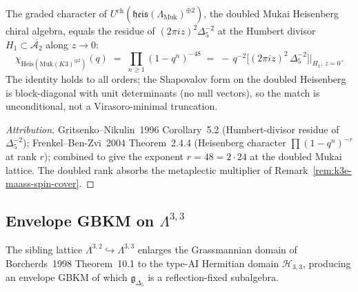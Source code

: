 \begin{theorem}
\label{thm:plat-heis-mukai-48}
The graded character of $U^{\mathrm{ch}}(\mathfrak{heis}(\Lambda_{\mathrm{Muk}})^{\oplus 2})$, the doubled Mukai Heisenberg chiral algebra, equals the residue of $(2\pi i z)^2 \Delta_5^{-2}$ at the Humbert divisor $H_1 \subset \overline{\mathcal{A}_2}$ along $z \to 0$:
\[
 \chi_{\mathrm{Heis}(\mathrm{Muk}(K3)^{\oplus 2})}(q) \;=\; \prod_{n \geq 1}(1 - q^n)^{-48} \;=\; -\,q^{-2}\bigl[(2\pi i z)^2\, \Delta_5^{-2}\bigr]\Big|_{H_1,\, z = 0}.
\]
The identity holds to all orders; the Shapovalov form on the doubled Heisenberg is block-diagonal with unit determinants (no null vectors), so the match is unconditional, not a Virasoro-minimal truncation.
\end{theorem}

\begin{proof}[Attribution]
Gritsenko--Nikulin~1996 Corollary~5.2 (Humbert-divisor residue of $\Delta_5^{-2}$); Frenkel--Ben-Zvi~2004 Theorem~2.4.4 (Heisenberg character $\prod(1 - q^n)^{-r}$ at rank $r$); combined to give the exponent $r = 48 = 2 \cdot 24$ at the doubled Mukai lattice. The doubled rank absorbs the metaplectic multiplier of Remark~\ref{rem:k3e-maass-spin-cover}.
\end{proof}

\subsection{Envelope GBKM on \texorpdfstring{$\Lambda^{3,3}$}{Lambda-3,3}}
\label{subsec:k3e-platonic-envelope}

The sibling lattice $\Lambda^{3, 2} \hookrightarrow \Lambda^{3, 3}$ enlarges the Grassmannian domain of Borcherds~1998 Theorem~10.1 to the type-AI Hermitian domain $\mathcal{H}_{3, 3}$, producing an envelope GBKM of which $\mathfrak{g}_{\Delta_5}$ is a reflection-fixed subalgebra.

